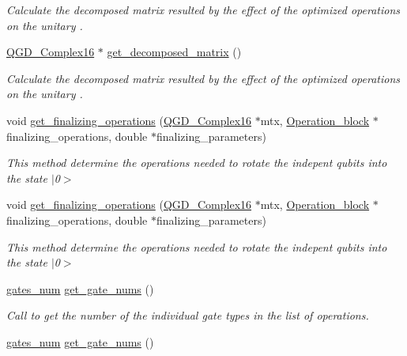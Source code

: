 \begin{DoxyCompactItemize}
\begin{DoxyCompactList}\small\item\em Calculate the decomposed matrix resulted by the effect of the optimized operations on the unitary . \end{DoxyCompactList}\item 
\hyperlink{struct_q_g_d___complex16}{Q\+G\+D\+\_\+\+Complex16} $\ast$ \hyperlink{class_decomposition___base_a40154345dce69fd5a9cb28c0b677746b}{get\+\_\+decomposed\+\_\+matrix} ()
\begin{DoxyCompactList}\small\item\em Calculate the decomposed matrix resulted by the effect of the optimized operations on the unitary . \end{DoxyCompactList}\item 
void \hyperlink{class_decomposition___base_a9832cc5308c00b73d3e6bc331a77c7f7}{get\+\_\+finalizing\+\_\+operations} (\hyperlink{struct_q_g_d___complex16}{Q\+G\+D\+\_\+\+Complex16} $\ast$mtx, \hyperlink{class_operation__block}{Operation\+\_\+block} $\ast$finalizing\+\_\+operations, double $\ast$finalizing\+\_\+parameters)
\begin{DoxyCompactList}\small\item\em This method determine the operations needed to rotate the indepent qubits into the state $\vert$0$>$ \end{DoxyCompactList}\item 
void \hyperlink{class_decomposition___base_a9832cc5308c00b73d3e6bc331a77c7f7}{get\+\_\+finalizing\+\_\+operations} (\hyperlink{struct_q_g_d___complex16}{Q\+G\+D\+\_\+\+Complex16} $\ast$mtx, \hyperlink{class_operation__block}{Operation\+\_\+block} $\ast$finalizing\+\_\+operations, double $\ast$finalizing\+\_\+parameters)
\begin{DoxyCompactList}\small\item\em This method determine the operations needed to rotate the indepent qubits into the state $\vert$0$>$ \end{DoxyCompactList}\item 
\hyperlink{structgates__num}{gates\+\_\+num} \hyperlink{class_operation__block_ac39ab782da3e34c8ec4acf6181fbc5f7}{get\+\_\+gate\+\_\+nums} ()
\begin{DoxyCompactList}\small\item\em Call to get the number of the individual gate types in the list of operations. \end{DoxyCompactList}\item 
\hyperlink{structgates__num}{gates\+\_\+num} \hyperlink{class_operation__block_ac39ab782da3e34c8ec4acf6181fbc5f7}{get\+\_\+gate\+\_\+nums} ()

\end{DoxyCompactItemize}
